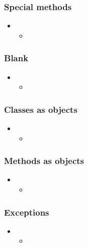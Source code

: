 \begin{frame}[fragile]
%
  \frametitle{Special methods}
%
  \begin{itemize}
%
  \item 
    \begin{itemize}
    \item
    \end{itemize}
%
  \end{itemize}
%
\end{frame}

\begin{frame}[fragile]
%
  \frametitle{Blank}
%
  \begin{itemize}
%
  \item 
    \begin{itemize}
    \item
    \end{itemize}
%
  \end{itemize}
%
\end{frame}

\begin{frame}[fragile]
%
  \frametitle{Classes as objects}
%
  \begin{itemize}
%
  \item 
    \begin{itemize}
    \item
    \end{itemize}
%
  \end{itemize}
%
\end{frame}

\begin{frame}[fragile]
%
  \frametitle{Methods as objects}
%
  \begin{itemize}
%
  \item 
    \begin{itemize}
    \item
    \end{itemize}
%
  \end{itemize}
%
\end{frame}

\begin{frame}[fragile]
%
  \frametitle{Exceptions}
%
  \begin{itemize}
%
  \item 
    \begin{itemize}
    \item
    \end{itemize}
%
  \end{itemize}
%
\end{frame}

